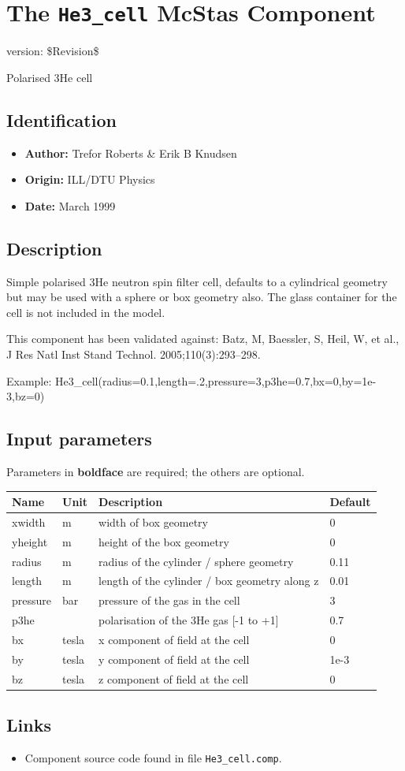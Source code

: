 \section{The \texttt{He3\_cell} McStas Component}
version: \$Revision\$

Polarised 3He cell

\subsection*{Identification}
\begin{itemize}
  \item \textbf{Author:} Trefor Roberts \& Erik B Knudsen
  \item \textbf{Origin:} ILL/DTU Physics
  \item \textbf{Date:} March 1999
\end{itemize}

\subsection*{Description}
Simple polarised 3He neutron spin filter cell, defaults to a cylindrical geometry but may be used with a sphere or box geometry also. The glass container for the cell is not included in the model.

This component has been validated against: Batz, M, Baessler, S, Heil, W, et al., J Res Natl Inst Stand Technol. 2005;110(3):293–298.

Example: He3\_cell(radius=0.1,length=.2,pressure=3,p3he=0.7,bx=0,by=1e-3,bz=0)

\subsection*{Input parameters}
Parameters in \textbf{boldface} are required; the others are optional.

\begin{longtable}{p{}p{}p{}p{}}
\toprule
\textbf{Name} & \textbf{Unit} & \textbf{Description} & \textbf{Default} \\
\midrule
\endhead
xwidth & m & width of box geometry & 0 \\
yheight & m & height of the box geometry & 0 \\
radius & m & radius of the cylinder / sphere geometry & 0.11 \\
length & m & length of the cylinder / box geometry along z & 0.01 \\
pressure & bar & pressure of the gas in the cell & 3 \\
p3he &   & polarisation of the 3He gas [-1 to +1] & 0.7 \\
bx & tesla & x component of field at the cell & 0 \\
by & tesla & y component of field at the cell & 1e-3 \\
bz & tesla & z component of field at the cell & 0 \\
\bottomrule
\end{longtable}

\subsection*{Links}
\begin{itemize}
  \item Component source code found in file \texttt{He3\_cell.comp}.
\end{itemize}
